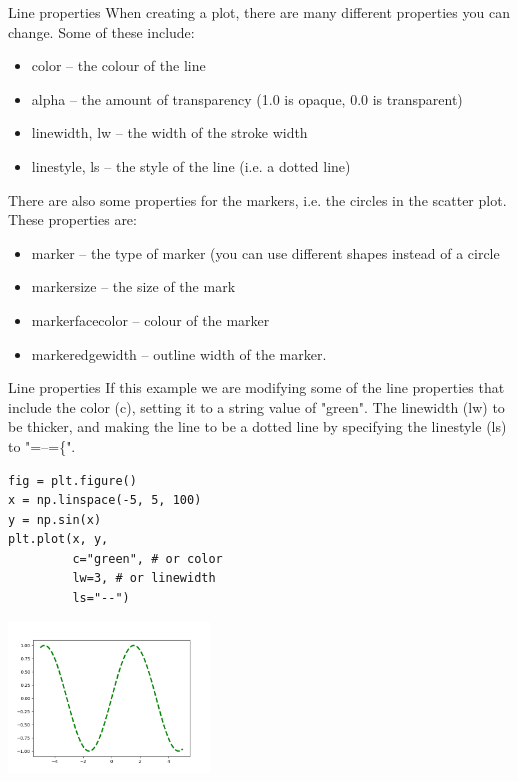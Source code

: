 \documentclass[10pt]{beamer}
\begin{document}
\begin{frame}[label={sec:orgd5a73c2}]{Line properties}
When creating a plot, there are many different properties you can change. Some
of these include:

\begin{itemize}
\item color -- the colour of the line
\item alpha -- the amount of transparency (1.0 is opaque, 0.0 is transparent)
\item linewidth, lw -- the width of the stroke width
\item linestyle, ls -- the style of the line (i.e. a dotted line)
\end{itemize}

There are also some properties for the markers, i.e. the circles in the scatter
plot. These properties are:

\begin{itemize}
\item marker -- the type of marker (you can use different shapes instead of a circle
\item markersize -- the size of the mark
\item markerfacecolor -- colour of the marker
\item markeredgewidth -- outline width of the marker.
\end{itemize}
\end{frame}

\begin{frame}[label={sec:orga728e6d},fragile]{Line properties}
 If this example we are modifying some of the line properties that include the
color (c), setting it to a string value of "green". The linewidth (lw) to be
thicker, and making the line to be a dotted line by specifying the linestyle
(ls) to "=--=\{".

\begin{verbatim}
fig = plt.figure()
x = np.linspace(-5, 5, 100)
y = np.sin(x)
plt.plot(x, y,
         c="green", # or color
         lw=3, # or linewidth
         ls="--")
\end{verbatim}

\begin{center}
\includegraphics[width=0.4\textwidth]{images/linestyles.png}
\end{center}
\end{frame}
\end{document}
